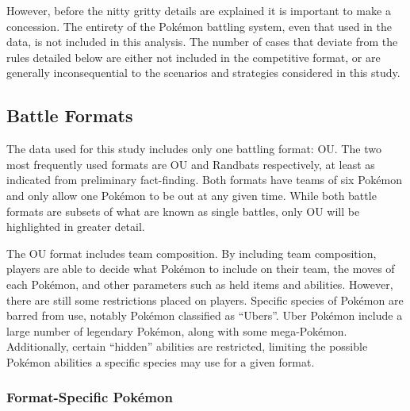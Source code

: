 \documentclass[12pt,twoside]{reedthesis}
\begin{document}
  However, before the nitty gritty details are explained it is important
  to make a concession. The entirety of the Pokémon battling system, even
  that used in the data, is not included in this analysis. The number of
  cases that deviate from the rules detailed below are either not included
  in the competitive format, or are generally inconsequential to the
  scenarios and strategies considered in this study.
  
  \subsection{Battle Formats}\label{battle-formats}
  
  The data used for this study includes only one battling format: OU. The
  two most frequently used formats are OU and Randbats respectively, at
  least as indicated from preliminary fact-finding. Both formats have
  teams of six Pokémon and only allow one Pokémon to be out at any given
  time. While both battle formats are subsets of what are known as single
  battles, only OU will be highlighted in greater detail.
  
  The OU format includes team composition. By including team composition,
  players are able to decide what Pokémon to include on their team, the
  moves of each Pokémon, and other parameters such as held items and
  abilities. However, there are still some restrictions placed on players.
  Specific species of Pokémon are barred from use, notably Pokémon
  classified as ``Ubers''. Uber Pokémon include a large number of
  legendary Pokémon, along with some mega-Pokémon. Additionally, certain
  ``hidden'' abilities are restricted, limiting the possible Pokémon
  abilities a specific species may use for a given format.
  
  \subsubsection{Format-Specific Pokémon}\label{format-specific-pokemon}
  
\end{document}
